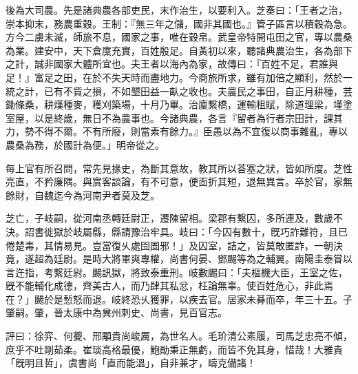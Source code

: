 \begin{pinyinscope}
後為大司農。先是諸典農各部吏民，末作治生，以要利入。芝奏曰：「王者之治，崇本抑末，務農重穀。王制：『無三年之儲，國非其國也。』管子區言以積穀為急。方今二虜未滅，師旅不息，國家之事，唯在穀帛。武皇帝特開屯田之官，專以農桑為業。建安中，天下倉廩充實，百姓殷足。自黃初以來，聽諸典農治生，各為部下之計，誠非國家大體所宜也。夫王者以海內為家，故傳曰：『百姓不足，君誰與足！』富足之田，在於不失天時而盡地力。今商旅所求，雖有加倍之顯利，然於一統之計，已有不貲之損，不如墾田益一畒之收也。夫農民之事田，自正月耕種，芸鋤條桑，耕熯種麥，穫刈築場，十月乃畢。治廩繫橋，運輸租賦，除道理梁，墐塗室屋，以是終歲，無日不為農事也。今諸典農，各言『留者為行者宗田計，課其力，勢不得不爾。不有所廢，則當素有餘力。』臣愚以為不宜復以商事雜亂，專以農桑為務，於國計為便。」明帝從之。

每上官有所召問，常先見掾史，為斷其意故，教其所以荅塞之狀，皆如所度。芝性亮直，不矜廉隅。與賔客談論，有不可意，便靣折其短，退無異言。卒於官，家無餘財，自魏迄今為河南尹者莫及芝。

芝亡，子岐嗣，從河南丞轉廷尉正，遷陳留相。梁郡有繫囚，多所連及，數歲不決。詔書徙獄於岐屬縣，縣請豫治牢具。岐曰：「今囚有數十，旣巧詐難符，且已倦楚毒，其情易見。豈當復乆處囹圄邪！」及囚室，詰之，皆莫敢匿詐，一朝決竟，遂超為廷尉。是時大將軍爽專權，尚書何晏、鄧颺等為之輔翼。南陽圭泰甞以言迕指，考繫廷尉。颺訊獄，將致泰重刑。岐數颺曰：「夫樞機大臣，王室之佐，旣不能輔化成德，齊美古人，而乃肆其私忿，枉論無辜。使百姓危心，非此焉在？」颺於是慙怒而退。岐終恐乆獲罪，以疾去官。居家未朞而卒，年三十五。子肇嗣。肇，晉太康中為兾州刺史、尚書，見百官志。

評曰：徐弈、何夔、邢顒貴尚峻厲，為世名人。毛玠清公素履，司馬芝忠亮不傾，庶乎不吐剛茹柔。崔琰高格最優，鮑勛秉正無虧，而皆不免其身，惜哉！大雅貴「旣明且哲」，虞書尚「直而能溫」，自非兼才，疇克備諸！


\end{pinyinscope}